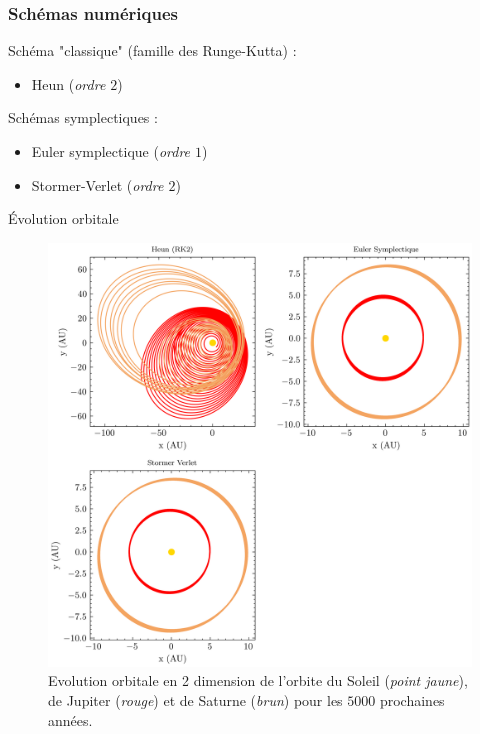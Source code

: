 \documentclass[10pt]{beamer}
\begin{document}
\begin{frame}
\frametitle{Schémas numériques}
Schéma "classique" (famille des Runge-Kutta) :
\begin{itemize}
  \item Heun (\textit{ordre $2$})
\end{itemize}
Schémas symplectiques :
\begin{itemize}
  \item Euler symplectique (\textit{ordre $1$})
  \item Stormer-Verlet (\textit{ordre $2$})
\end{itemize}
\end{frame}

\begin{frame}{Évolution orbitale}
  \begin{figure}
      \centering
      \includegraphics[width=\textwidth,height=0.7\textheight,keepaspectratio]{figures/5000_years/orbital-plot2d.png}
      \caption{Evolution orbitale en 2 dimension de l'orbite du Soleil (\emph{point jaune}), de Jupiter (\emph{rouge}) et de Saturne (\emph{brun}) pour les $5000$ prochaines années.}
      \label{fig:plot2D--5000}
  \end{figure}
\end{frame}
\end{document}
